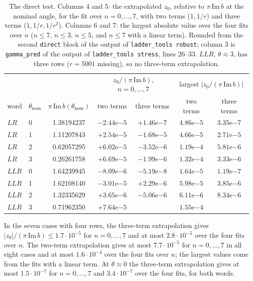 \documentclass[11pt]{amsart}
\theoremstyle{definition}
\theoremstyle{remark}
\begin{document}
\begin{table}[ht]
\centering
\small
\setlength{\tabcolsep}{4pt}
\begin{tabular}{llccccc}
\toprule
& & & \multicolumn{2}{c}{$z_0/(\pi\,\mathrm{Im}\,b)$, $n = 0, \dots, 7$}
& \multicolumn{2}{c}{largest $|z_0/(\pi\,\mathrm{Im}\,b)|$} \\
word & $\theta_{\mathrm{nom}}$ & $\pi\,\mathrm{Im}\,b(\theta_{\mathrm{nom}})$ & two terms & three terms & two terms & three terms \\
\midrule
$LR$  & 0 & 1.38194237 & $-2.44\mathrm{e}{-5}$ & $+1.46\mathrm{e}{-7}$ & $4.86\mathrm{e}{-5}$ & $3.35\mathrm{e}{-7}$ \\
$LR$  & 1 & 1.11207843 & $+2.54\mathrm{e}{-5}$ & $-1.68\mathrm{e}{-5}$ & $4.66\mathrm{e}{-5}$ & $2.71\mathrm{e}{-5}$ \\
$LR$  & 2 & 0.62057295 & $+6.02\mathrm{e}{-5}$ & $-3.52\mathrm{e}{-6}$ & $1.19\mathrm{e}{-4}$ & $5.81\mathrm{e}{-6}$ \\
$LR$  & 3 & 0.26261758 & $+6.69\mathrm{e}{-5}$ & $-1.99\mathrm{e}{-6}$ & $1.32\mathrm{e}{-4}$ & $3.33\mathrm{e}{-6}$ \\
$LLR$ & 0 & 1.64239945 & $-8.09\mathrm{e}{-6}$ & $-5.19\mathrm{e}{-8}$ & $1.64\mathrm{e}{-5}$ & $1.19\mathrm{e}{-7}$ \\
$LLR$ & 1 & 1.62108140 & $-3.01\mathrm{e}{-5}$ & $+2.29\mathrm{e}{-6}$ & $5.98\mathrm{e}{-5}$ & $3.85\mathrm{e}{-6}$ \\
$LLR$ & 2 & 1.32335629 & $+3.65\mathrm{e}{-6}$ & $-5.06\mathrm{e}{-6}$ & $6.11\mathrm{e}{-6}$ & $8.34\mathrm{e}{-6}$ \\
$LLR$ & 3 & 0.71962350 & $+7.64\mathrm{e}{-5}$ & & $1.55\mathrm{e}{-4}$ & \\
\bottomrule
\end{tabular}
\caption{The direct test. Columns 4 and 5: the extrapolated $z_0$, relative to
$\pi\,\mathrm{Im}\,b$ at the nominal angle, for the fit over $n = 0, \dots, 7$, with
two terms ($1, 1/r$) and three terms ($1, 1/r, 1/r^2$). Columns 6 and 7: the largest
absolute value over the four fits over $n$ ($n \le 7$, $n \le 3$, $n \le 5$, and
$n \le 7$ with a linear term). Rounded from the second \texttt{direct} block of the
output of \texttt{ladder\_tools robust}; column 3 is \texttt{gamma\_pred} of the
output of \texttt{ladder\_tools stress}, lines 26--33. $LLR$, $\theta \approx 3$, has
three rows ($r = 5001$ missing), so no three-term extrapolation.}
\label{tab:direct}
\end{table}

In the seven cases with four rows, the three-term extrapolation gives
$|z_0|/(\pi\,\mathrm{Im}\,b) \le 1.7\cdot10^{-5}$ for $n = 0, \dots, 7$ and at most
$2.8\cdot10^{-5}$ over the four fits over $n$. The two-term extrapolation gives at most
$7.7\cdot10^{-5}$ for $n = 0, \dots, 7$ in all eight cases and at most
$1.6\cdot10^{-4}$ over the four fits over $n$; the largest values come from the fits
with a linear term. At $\theta \approx 0$ the three-term extrapolation gives at most
$1.5\cdot10^{-7}$ for $n = 0, \dots, 7$ and $3.4\cdot10^{-7}$ over the four fits, for
both words.
\end{document}
